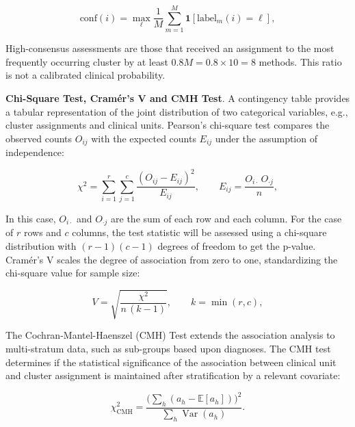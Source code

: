 \begin{equation}\label{eq:consensus}
\mathrm{conf}(i)=\max_{\ell}\frac{1}{M}\sum_{m=1}^{M}\mathbf{1}\!\left[\text{label}_m(i)=\ell\right],
\end{equation}

High-consensus assessments are those that received an assignment to the most frequently occurring cluster by at least \(0.8M = 0.8 \times 10 = 8\) methods. This ratio is not a calibrated clinical probability.

\textbf{Chi-Square Test, Cramér's V and CMH Test}. A contingency table provides a tabular representation of the joint distribution of two categorical variables, e.g., cluster assignments and clinical units. Pearson's chi-square test compares the observed counts \(O_{ij}\) with the expected counts \(E_{ij}\) under the assumption of independence:

\begin{equation}\label{eq:chi2}
\chi^2=\sum_{i=1}^{r}\sum_{j=1}^{c}\frac{(O_{ij}-E_{ij})^2}{E_{ij}},\qquad E_{ij}=\frac{O_{i\cdot}\,O_{\cdot j}}{n},
\end{equation}

In this case, \(O_{i\cdot}\) and \(O_{\cdot j}\) are the sum of each row and each column. For the case of \(r\) rows and \(c\) columns, the test statistic will be assessed using a chi-square distribution with \((r - 1)(c - 1)\) degrees of freedom to get the p-value. Cramér's V scales the degree of association from zero to one, standardizing the chi-square value for sample size:

\begin{equation}\label{eq:cramersv}
V=\sqrt{\frac{\chi^2}{n\,(k-1)}},\qquad k=\min(r,c),
\end{equation}

The Cochran-Mantel-Haenszel (CMH) Test extends the association analysis to multi-stratum data, such as sub-groups based upon diagnoses. The CMH test determines if the statistical significance of the association between clinical unit and cluster assignment is maintained after stratification by a relevant covariate:

\begin{equation}\label{eq:cmh}
\chi^2_{\mathrm{CMH}}=\frac{\bigl(\sum_{h}(a_h-\mathbb{E}[a_h])\bigr)^2}{\sum_{h}\operatorname{Var}(a_h)}.
\end{equation}

